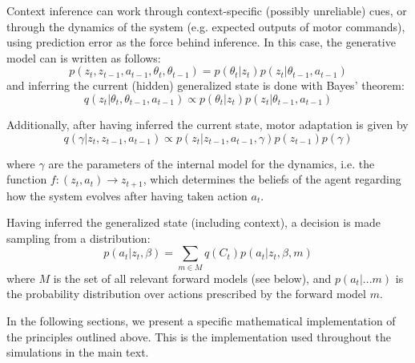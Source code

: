 \documentclass[a4paper,doc,floatsintext,natbib]{apa6}
\begin{document}
Context inference can work through context-specific (possibly unreliable) cues,
or through the dynamics of the system (e.g. expected outputs of motor
commands), using prediction error as the force behind inference. In this case,
the generative model can is written as follows:
\[
p(z_t, z_{t-1}, a_{t-1}, \theta_t, \theta_{t-1}) = p(\theta_t | z_t)p(z_t|\theta_{t-1}, a_{t-1})
\]
and inferring the current (hidden) generalized state is done with Bayes' theorem:
\[
  q(z_t | \theta_t, \theta_{t-1}, a_{t-1}) \propto p(\theta_t | z_t)p(z_t|\theta_{t-1}, a_{t-1})
\]
  
Additionally, after having inferred the current state, motor adaptation is given by
\[
q(\gamma | z_t, z_{t-1}, a_{t-1}) \propto p(z_t | z_{t-1}, a_{t-1}, \gamma)p(z_{t-1})p(\gamma)
\]

where $\gamma$ are the parameters of the internal model for the dynamics,
i.e. the function $f: (z_t, a_t) \rightarrow z_{t+1}$, which determines the beliefs of
the agent regarding how the system evolves after having taken action $a_t$.

Having inferred the generalized state (including context), a decision is made
sampling from a distribution:
\begin{equation}
p(a_t | z_t, \beta) = \displaystyle\sum_{m \in M}q(C_t)p(a_t | z_t, \beta, m)
\end{equation}
where $M$ is the set of all relevant forward models (see below), and
$p(a_t | ... m)$ is the probability distribution over actions prescribed by the
forward model $m$.

In the following sections, we present a specific mathematical implementation
of the principles outlined above. This is the implementation used throughout the
simulations in the main text.
\end{document}
